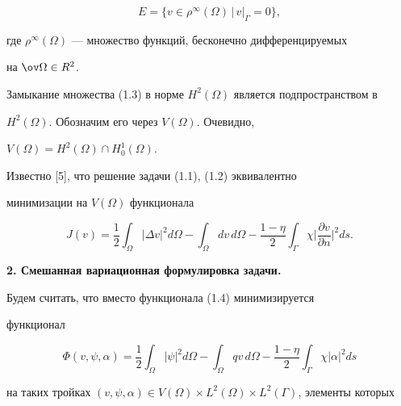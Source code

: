 \begin{equation} 


E=\{v\in\rho^\infty(\Omega)\,\big|\,v|_\Gamma=0\}, 


\end{equation} 


где $\rho^\infty(\Omega)$ --- множество функций, бесконечно дифференцируемых 


на $\ov\Omega\in R^2$. 


Замыкание множества (1.3) в норме $H^2(\Omega)$ является подпространством в 


$H^2(\Omega)$. Обозначим его через $V(\Omega)$. Очевидно, 


$V(\Omega)=H^2(\Omega)\cap H^1_0(\Omega)$. 


 


Известно [5], что решение задачи (1.1), (1.2) эквивалентно 


минимизации на $V(\Omega)$ функционала 


\begin{equation} 


J(v)=\frac{1}{2}\int_\Omega|\Delta v|^2d\Omega-\int_\Omega dv\,d\Omega 


-\frac{1-\eta}{2}\int_\Gamma \chi 


\bigg|\frac{\partial v}{\partial n}\bigg|^2ds. 


\end{equation} 


\medskip 


\addtocounter{section}{1} 


\setcounter{equation}{0} 


 


{\bf 2. Смешанная вариационная формулировка задачи.} 


Будем считать, что вместо функционала (1.4) минимизируется 


функционал 


\begin{equation} 


\Phi(v,\psi,\alpha)=\frac{1}{2}\int_\Omega|\psi|^2d\Omega- 


\int_\Omega qv\,d\Omega-\frac{1-\eta}{2}\int_\Gamma \chi|\alpha|^2ds 


\end{equation} 


на таких тройках $(v,\psi,\alpha)\in V(\Omega)\times L^2(\Omega)\times 


L^2(\Gamma)$, элементы которых 


